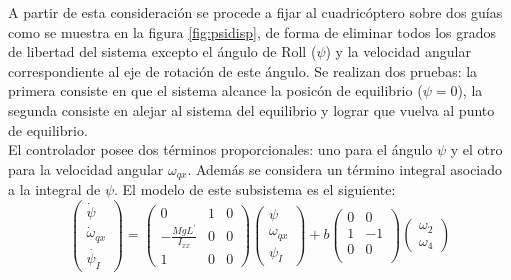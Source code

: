 \documentclass[main]{subfiles}
\begin{document}
A partir de esta consideraci\'on se procede a fijar al cuadric\'optero sobre dos gu\'ias como se muestra en la figura \ref{fig:psidisp}, de forma de eliminar todos los grados de libertad del sistema excepto el \'angulo de Roll ($\psi$) y la velocidad angular correspondiente al eje de rotaci\'on de este ángulo. Se realizan dos pruebas: la primera consiste en que el sistema alcance la posic\'on de equilibrio ($\psi = 0$), la segunda consiste en alejar al sistema del equilibrio y lograr que vuelva al punto de equilibrio.\\

El controlador posee dos términos proporcionales: uno para el \'angulo $\psi$ y el otro para la velocidad angular $\omega_{qx}$. Además se considera un t\'ermino integral asociado a la integral de $\psi$. El modelo de este subsistema es el siguiente:
\begin{equation}
\left(\begin{array}{c}
\dot{\psi}\\
\dot{\omega}_{qx}\\
\dot{\psi_I}
\end{array}\right) = \left(\begin{array}{ccc}
0 & 1 & 0\\
-\frac{MgL^\prime}{I_{xx}} & 0 & 0\\
1 & 0 &0
\end{array}\right) 
\left(\begin{array}{c}
{\psi}\\
{\omega}_{qx}\\
{\psi_I}
\end{array}\right)
+ b\left(\begin{array}{cc}
0 & 0\\
1 & -1\\
0 & 0\\
\end{array}\right) \left(\begin{array}{c}
\omega_2 \\
\omega_4
\end{array}\right)
\end{equation}
\end{document}
